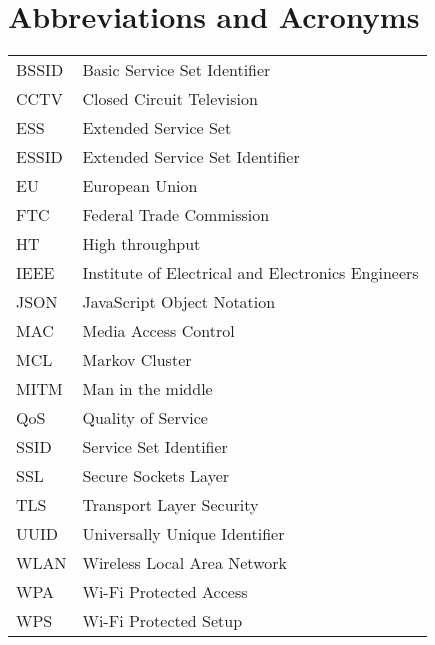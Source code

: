 \chapter*{Abbreviations and Acronyms}


\noindent
\begin{longtable}{@{}p{}p{}@{}}
BSSID & Basic Service Set Identifier \\
CCTV & Closed Circuit Television \\
ESS & Extended Service Set \\
ESSID & Extended Service Set Identifier \\
EU & European Union \\
FTC & Federal Trade Commission \\
HT & High throughput \\
IEEE & Institute of Electrical and Electronics Engineers \\
JSON & JavaScript Object Notation \\
MAC & Media Access Control \\
MCL & Markov Cluster \\
MITM & Man in the middle \\
QoS & Quality of Service \\
SSID & Service Set Identifier \\
SSL & Secure Sockets Layer \\
TLS & Transport Layer Security \\
UUID & Universally Unique Identifier \\
WLAN & Wireless Local Area Network \\
WPA & Wi-Fi Protected Access \\
WPS & Wi-Fi Protected Setup \\
\end{longtable}
